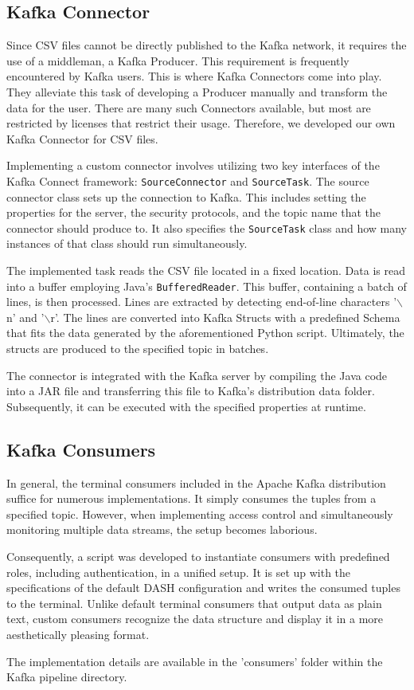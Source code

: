 \subsection{Kafka Connector\label{sec:kafka_connector}}
Since CSV files cannot be directly published to the Kafka network, it requires the use of a middleman, a Kafka Producer. This requirement is frequently encountered by Kafka users. This is where Kafka Connectors come into play. They alleviate this task of developing a Producer manually and transform the data for the user. There are many such Connectors available, but most are restricted by licenses that restrict their usage. Therefore, we developed our own Kafka Connector for CSV files. \par
Implementing a custom connector involves utilizing two key interfaces of the Kafka Connect framework: \texttt{SourceConnector} and \texttt{SourceTask}. The source connector class sets up the connection to Kafka. This includes setting the properties for the server, the security protocols, and the topic name that the connector should produce to. It also specifies the \texttt{SourceTask} class and how many instances of that class should run simultaneously.\par
The implemented task reads the CSV file located in a fixed location. Data is read into a buffer employing Java's \texttt{BufferedReader}. This buffer, containing a batch of lines, is then processed. Lines are extracted by detecting end-of-line characters '$\backslash$n' and '$\backslash$r'. The lines are converted into Kafka Structs with a predefined Schema that fits the data generated by the aforementioned Python script. Ultimately, the structs are produced to the specified topic in batches. \par
The connector is integrated with the Kafka server by compiling the Java code into a JAR file and transferring this file to Kafka's distribution data folder. Subsequently, it can be executed with the specified properties at runtime.

\subsection{Kafka Consumers\label{sec:kafka_consumer}}
In general, the terminal consumers included in the Apache Kafka distribution suffice for numerous implementations. It simply consumes the tuples from a specified topic. However, when implementing access control and simultaneously monitoring multiple data streams, the setup becomes laborious. \par
Consequently, a script was developed to instantiate consumers with predefined roles, including authentication, in a unified setup. It is set up with the specifications of the default \ac{DASH} configuration and writes the consumed tuples to the terminal. Unlike default terminal consumers that output data as plain text, custom consumers recognize the data structure and display it in a more aesthetically pleasing format. \par
The implementation details are available in the 'consumers' folder within the Kafka pipeline directory.


